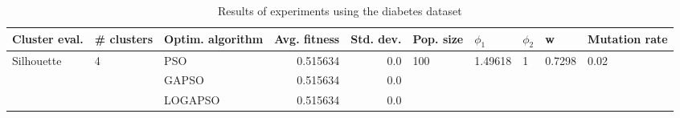 \begin{table}
\centering
\caption{Results of experiments using the diabetes dataset}
\begin{tabular}{lllrrlllll}
\toprule
              Cluster eval. &        \# clusters & Optim. algorithm &  Avg. fitness &  Std. dev. &            Pop. size &               $\phi_{1}$ &         $\phi_{2}$ &                       w &         Mutation rate \\
\midrule
\multirow{3}{*}{Silhouette} & \multirow{3}{*}{4} &              PSO &      0.515634 &        0.0 & \multirow{3}{*}{100} & \multirow{3}{*}{1.49618} & \multirow{3}{*}{1} & \multirow{3}{*}{0.7298} & \multirow{3}{*}{0.02} \\
                            &                    &            GAPSO &      0.515634 &        0.0 &                      &                          &                    &                         &                       \\
                            &                    &          LOGAPSO &      0.515634 &        0.0 &                      &                          &                    &                         &                       \\
\bottomrule
\end{tabular}
\end{table}
